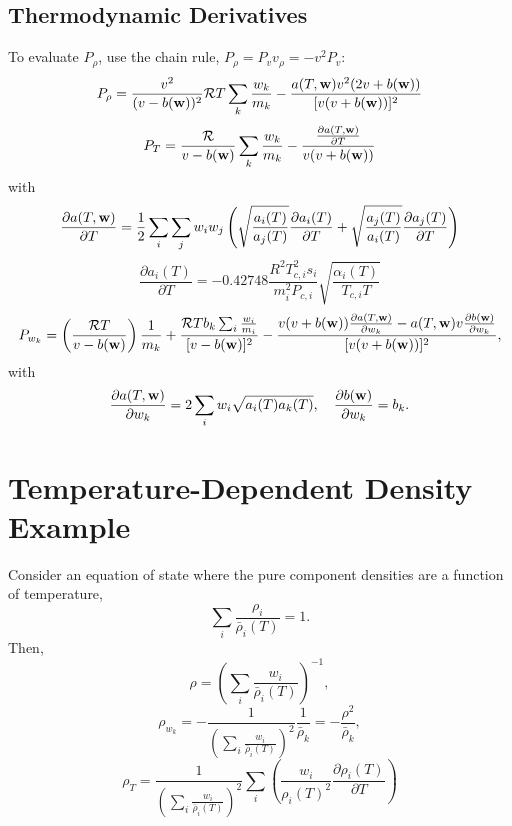 \documentclass[final]{siamltex}
\def\wb {{\bf w}}
\def\half   {\frac{1}{2}}
\begin{document}
\subsection{Thermodynamic Derivatives}
To evaluate $P_\rho$, use the chain rule, $P_\rho = P_v v_\rho = -v^2 P_v$:
\begin{equation}
P_\rho = \frac{v^2}{(v-b(\wb))^2}\mathcal{R}T\sum_k\frac{w_k}{m_k} - \frac{a(T,\wb)v^2(2v+b(\wb))}{[v(v+b(\wb))]^2}
\end{equation}
\begin{equation}
P_T = \frac{\mathcal{R}}{v-b(\wb)}\sum_k\frac{w_k}{m_k} - \frac{\frac{\partial a(T,\wb)}{\partial T}}{v(v+b(\wb))}
\end{equation}
with
\begin{equation}
\frac{\partial a(T,\wb)}{\partial T} = \half \sum_i\sum_j w_i w_j\left(\sqrt{\frac{a_i(T)}{a_j(T)}}\frac{\partial a_i(T)}{\partial T} + \sqrt{\frac{a_j(T)}{a_i(T)}}\frac{\partial a_j(T)}{\partial T}\right)
\end{equation}
\begin{equation}
\frac{\partial a_i(T)}{\partial T} = -0.42748\frac{R^2T_{c,i}^2s_i}{m_i^2 P_{c,i}}\sqrt{\frac{\alpha_i(T)}{T_{c,i}T}}
\end{equation}
\begin{equation}
P_{w_k} = \left(\frac{\mathcal{R}T}{v-b(\wb)}\right)\frac{1}{m_k}
+\frac{\mathcal{R}Tb_k\sum_i\frac{w_i}{m_i}}{[v-b(\wb)]^2}
- \frac{v(v+b(\wb))\frac{\partial a(T,\wb)}{\partial w_k} - a(T,\wb)v\frac{\partial b(\wb)}{\partial w_k}}{[v(v+b(\wb))]^2},
\end{equation}
with
\begin{equation}
\frac{\partial a(T,\wb)}{\partial w_k} = 2\sum_i w_i\sqrt{a_i(T)a_k(T)},
\quad
\frac{\partial b(\wb)}{\partial w_k} = b_k.
\end{equation}

\section{Temperature-Dependent Density Example}
Consider an equation of state where the pure component densities are a function
of temperature,
\begin{equation}
\sum_i\frac{\rho_i}{\bar\rho_i(T)} = 1.
\end{equation}
Then,
\begin{equation}
\rho = \left(\sum_i\frac{w_i}{\bar\rho_i(T)}\right)^{-1},
\end{equation}
\begin{equation}
\rho_{w_k} = -\frac{1}{\left(\sum_i\frac{w_i}{\bar\rho_i(T)}\right)^2}\frac{1}{\bar\rho_k}
= -\frac{\rho^2}{\bar\rho_k},
\end{equation}
\begin{equation}
\rho_T = \frac{1}{\left(\sum_i\frac{w_i}{\bar\rho_i(T)}\right)^2}\sum_i\left(\frac{w_i}{\rho_i(T)^2}\frac{\partial\rho_i(T)}{\partial T}\right)
\end{equation}
\end{document}
